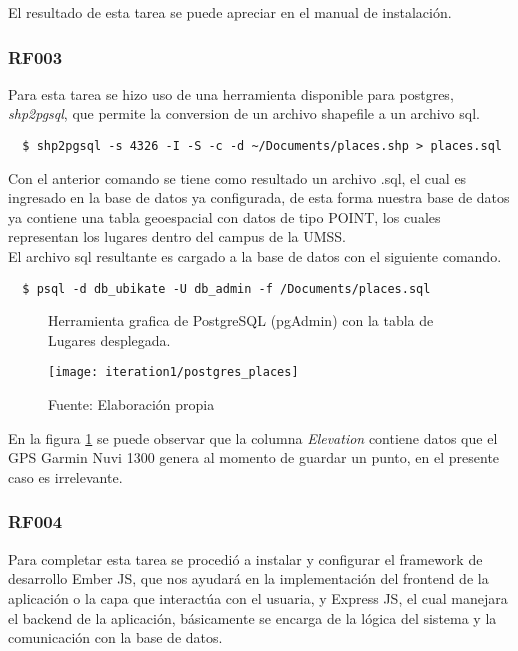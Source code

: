 El resultado de esta tarea se puede apreciar en el manual de instalación.\\

\subsubsection{RF003}
\label{subs:RF003}

Para esta tarea se hizo uso de una herramienta disponible para postgres, \emph{shp2pgsql}, que permite la conversion de un archivo shapefile a un archivo sql.

\begin{verbatim}
  $ shp2pgsql -s 4326 -I -S -c -d ~/Documents/places.shp > places.sql
\end{verbatim}

Con el anterior comando se tiene como resultado un archivo .sql, el cual es ingresado en la base de datos ya configurada, de esta forma nuestra base de datos ya contiene una tabla geoespacial con datos de tipo POINT, los cuales representan los lugares dentro del campus de la UMSS.\\

El archivo sql resultante es cargado a la base de datos con el siguiente comando.\\

\begin{verbatim}
  $ psql -d db_ubikate -U db_admin -f /Documents/places.sql
\end{verbatim}

\begin{figure}[H]
  \begin{center}
    \caption{Herramienta grafica de PostgreSQL (pgAdmin) con la tabla de Lugares desplegada.}
    \label{fig:postgres_places}
    \texttt{[image: iteration1/postgres\_places]}
    \caption*{Fuente: Elaboración propia}
  \end{center}
\end{figure}

En la figura \ref{fig:postgres_places} se puede observar que la columna \emph{Elevation} contiene datos que el GPS Garmin Nuvi 1300 genera al momento de guardar un punto, en el presente caso es irrelevante.\\

\subsubsection{RF004}
\label{subs:RF004}

Para completar esta tarea se procedió a instalar y configurar el framework de desarrollo Ember JS, que nos ayudará en la implementación del frontend de la aplicación o la capa que interactúa con el usuaria, y Express JS, el cual manejara el backend de la aplicación, básicamente se encarga de la lógica del sistema y la comunicación con la base de datos.\\

